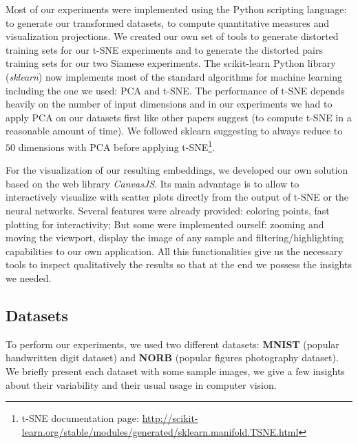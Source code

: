 \documentclass[a4paper,12pt]{report}
\begin{document}

Most of our experiments were implemented using the Python scripting language: to generate our transformed datasets, to compute quantitative measures and visualization projections.
We created our own set of tools to generate distorted training sets for our t-SNE experiments and to generate the distorted pairs training sets for our two Siamese experiments.
The scikit-learn Python library ({\em sklearn}) now implements most of the standard algorithms for machine learning including the one we used: PCA and t-SNE\cite{pedregosa2011scikit}.
The performance of t-SNE depends heavily on the number of input dimensions and in our experiments we had to apply PCA on our datasets first like other papers suggest\cite{t-SNE} (to compute t-SNE in a reasonable amount of time).
We followed sklearn suggesting to always reduce to $50$ dimensions with PCA before applying t-SNE\footnote{t-SNE documentation page: \url{http://scikit-learn.org/stable/modules/generated/sklearn.manifold.TSNE.html}}.

For the visualization of our resulting embeddings, we developed our own solution based on the web library {\em CanvasJS}.
Its main advantage is to allow to interactively visualize with scatter plots directly from the output of t-SNE or the neural networks.
Several features were already provided: coloring points, fast plotting for interactivity; But some were implemented ourself: zooming and moving the viewport, display the image of any sample and filtering/highlighting capabilities to our own application.
All this functionalities give us the necessary tools to inspect qualitatively the results so that at the end we possess the insights we needed.

\subsection{Datasets}
To perform our experiments, we used two different datasets: {\bf MNIST}\cite{lecun1998mnist} (popular handwritten digit dataset) and {\bf NORB}\cite{lecun2004learning} (popular figures photography dataset).
We briefly present each dataset with some sample images, we give a few insights about their variability and their usual usage in computer vision.
\end{document}
